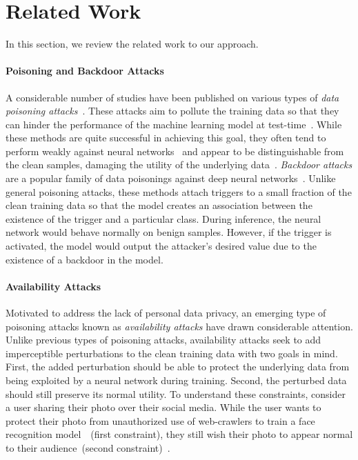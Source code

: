 \documentclass[conference]{IEEEtran}
\theoremstyle{definition}
\theoremstyle{remark}
\theoremstyle{proposition}
\begin{document}
\section{Related Work}\label{sec:related}
In this section, we review the related work to our approach.

\paragraph{Poisoning and Backdoor Attacks}
A considerable number of studies have been published on various types of \textit{data poisoning attacks}~\citep{biggio2018wild, schwarzschild2021toxic, goldblum2023dataset}.
These attacks aim to pollute the training data so that they can hinder the performance of the machine learning model at test-time~\citep{biggio2012svmbackdoor, koh2017understanding, munozgonzalez2017towards}.
While these methods are quite successful in achieving this goal, they often tend to perform weakly against neural networks~\citep{munozgonzalez2017towards} and appear to be distinguishable from the clean samples, damaging the utility of the underlying data~\citep{yang2017generative}.
\textit{Backdoor attacks} are a popular family of data poisonings against deep neural networks~\citep{gu2017badnets,barni2019sig,tran2018ss,dolatabadi2022collider}.
Unlike general poisoning attacks, these methods attach triggers to a small fraction of the clean training data so that the model creates an association between the existence of the trigger and a particular class.
During inference, the neural network would behave normally on benign samples.
However, if the trigger is activated, the model would output the attacker's desired value due to the existence of a backdoor in the model.

\paragraph{Availability Attacks}
Motivated to address the lack of personal data privacy, an emerging type of poisoning attacks known as \textit{availability attacks} have drawn considerable attention.
Unlike previous types of poisoning attacks, availability attacks seek to add imperceptible perturbations to the clean training data with two goals in mind.
First, the added perturbation should be able to protect the underlying data from being exploited by a neural network during training.
Second, the perturbed data should still preserve its normal utility.
To understand these constraints, consider a user sharing their photo over their social media.
While the user wants to protect their photo from unauthorized use of web-crawlers to train a face recognition model~\citep{hill2019photos}~(first constraint), they still wish their photo to appear normal to their audience~(second constraint)~\citep{huang2021emn}.
\end{document}
